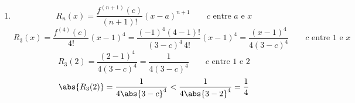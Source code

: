 \documentclass[a4paper,12pt,fleqn]{article}
\begin{document}
\begin{answer}
\begin{enumerate}[label=\alph*)]
  \item
  \[
    R_n(x) = \frac{f^{(n+1)}(c)}{(n+1)!}(x-a)^{n+1}
    \qquad c \text{ entre } a \text{ e } x
  \]
  \[
    R_3(x)
    = \frac{f^{(4)}(c)}{4!}(x-1)^4
    = \frac{(-1)^4(4-1)!}{(3-c)^4\,4!}(x-1)^4
    = \frac{(x-1)^4}{4(3-c)^4}
    \qquad c \text{ entre } 1 \text{ e } x
  \]
  \[
    R_3(2)
    = \frac{(2-1)^4}{4(3-c)^4}
    = \frac{1}{4(3-c)^4}
    \qquad c \text{ entre } 1 \text{ e } 2
  \]
  \[
    \abs{R_3(2)}
    = \frac{1}{4\abs{3-c}^4}
    < \frac{1}{4\abs{3-2}^4}
    = \frac{1}{4}
  \]

\end{enumerate}
\end{answer}

\end{document}
